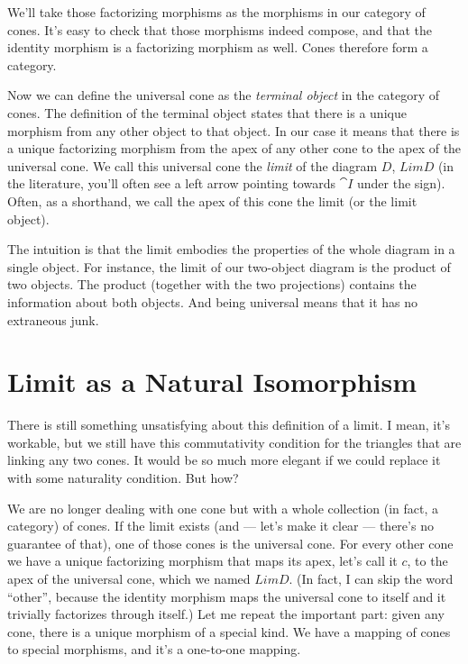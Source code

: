 \noindent
We'll take those factorizing morphisms as the morphisms in our category
of cones. It's easy to check that those morphisms indeed compose, and
that the identity morphism is a factorizing morphism as well. Cones
therefore form a category.

Now we can define the universal cone as the \emph{terminal object} in
the category of cones. The definition of the terminal object states that
there is a unique morphism from any other object to that object. In our
case it means that there is a unique factorizing morphism from the apex
of any other cone to the apex of the universal cone. We call this
universal cone the \emph{limit} of the diagram $D$, $Lim D$ (in
the literature, you'll often see a left arrow pointing towards $\cat{I}$
under the  sign). Often, as a shorthand, we call the apex of
this cone the limit (or the limit object).

The intuition is that the limit embodies the properties of the whole
diagram in a single object. For instance, the limit of our two-object
diagram is the product of two objects. The product (together with the
two projections) contains the information about both objects. And being
universal means that it has no extraneous junk.

\section{Limit as a Natural Isomorphism}\label{limit-as-a-natural-isomorphism}

There is still something unsatisfying about this definition of a limit.
I mean, it's workable, but we still have this commutativity condition
for the triangles that are linking any two cones. It would be so much
more elegant if we could replace it with some naturality condition. But
how?

We are no longer dealing with one cone but with a whole collection (in
fact, a category) of cones. If the limit exists (and --- let's make it
clear --- there's no guarantee of that), one of those cones is the
universal cone. For every other cone we have a unique factorizing
morphism that maps its apex, let's call it $c$, to the apex of
the universal cone, which we named $Lim D$. (In fact, I can skip
the word ``other'', because the identity morphism maps the universal
cone to itself and it trivially factorizes through itself.) Let me
repeat the important part: given any cone, there is a unique morphism of
a special kind. We have a mapping of cones to special morphisms, and
it's a one-to-one mapping.


